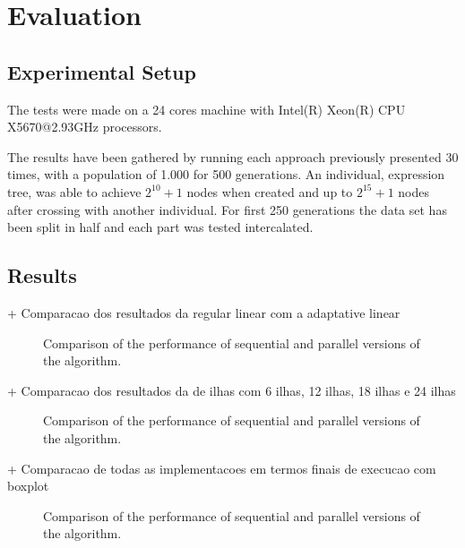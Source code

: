 \documentclass[runningheads]{llncs}
\begin{document}
\section{Evaluation}

\subsection{Experimental Setup}
The tests were made on a 24 cores machine with Intel(R) Xeon(R) CPU X5670@2.93GHz processors.

The results have been gathered by running each approach previously presented 30 times, with a population of 1.000 for 500 generations. An individual, expression tree, was able to achieve \(2^{10} + 1\) nodes when created and up to \(2^{15} + 1\) nodes after crossing with another individual. For first 250 generations the data set has been split in half and each part was tested intercalated.

\subsection{Results}

+ Comparacao dos resultados da regular linear com a adaptative linear

\begin{figure}[htbp]
\centering
{}
\caption{Comparison of the performance of sequential and parallel versions of the algorithm.} \label{fig1}
\end{figure}
+ Comparacao dos resultados da de ilhas com 6 ilhas, 12 ilhas, 18 ilhas e 24 ilhas

\begin{figure}[htbp]
\centering
{}
\caption{Comparison of the performance of sequential and parallel versions of the algorithm.} \label{fig1}
\end{figure}
+ Comparacao de todas as implementacoes em termos finais de execucao com boxplot

\begin{figure}[htbp]
\centering
{}
\caption{Comparison of the performance of sequential and parallel versions of the algorithm.} \label{fig1}
\end{figure}
\end{document}
